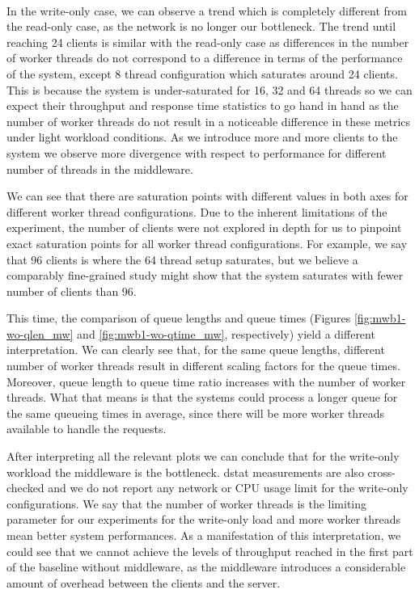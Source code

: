 \documentclass[11pt,a4paper]{article}
\begin{document}
\\
\par In the write-only case, we can observe a trend which is completely different from the read-only case, as the network is no longer our bottleneck. The trend until reaching 24 clients is similar with the read-only case as differences in the number of worker threads do not correspond to a difference in terms of the performance of the system, except 8 thread configuration which saturates around 24 clients. This is because the system is under-saturated for 16, 32 and 64 threads so we can expect their throughput and response time statistics to go hand in hand as the number of worker threads do not result in a noticeable difference in these metrics under light workload conditions. As we introduce more and more clients to the system we observe more divergence with respect to performance for different number of threads in the middleware.
\par We can see that there are saturation points with different values in both axes for different worker thread configurations. Due to the inherent limitations of the experiment, the number of clients were not explored in depth for us to pinpoint exact saturation points for all worker thread configurations. For example, we say that 96 clients is where the 64 thread setup saturates, but we believe a comparably fine-grained study might show that the system saturates with fewer number of clients than 96.
\par This time, the comparison of queue lengths and queue times (Figures \ref{fig:mwb1-wo-qlen_mw} and \ref{fig:mwb1-wo-qtime_mw}, respectively) yield a different interpretation. We can clearly see that, for the same queue lengths, different number of worker threads result in different scaling factors for the queue times. Moreover, queue length to queue time ratio increases with the number of worker threads. What that means is that the systems could process a longer queue for the same queueing times in average, since there will be more worker threads available to handle the requests.
\par After interpreting all the relevant plots we can conclude that for the write-only workload the middleware is the bottleneck. dstat measurements are also cross-checked and we do not report any network or CPU usage limit for the write-only configurations. We say that the number of worker threads is the limiting parameter for our experiments for the write-only load and more worker threads mean better system performances. As a manifestation of this interpretation, we could see that we cannot achieve the levels of throughput reached in the first part of the baseline without middleware, as the middleware introduces a considerable amount of overhead between the clients and the server.
\end{document}
